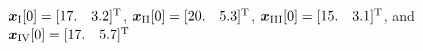 $\boldsymbol{x}_{\text{I}}[0]=[ \begin{matrix}
  17. & 3.2\\
\end{matrix} ]^{\mathrm{T}}$,
$\boldsymbol{x}_{\text{II}}[0]=[ \begin{matrix}
  20. & 5.3\\
\end{matrix} ]^{\mathrm{T}}$,
$\boldsymbol{x}_{\text{III}}[0]=[ \begin{matrix}
  15. & 3.1\\
\end{matrix} ]^{\mathrm{T}}$,
and
$\boldsymbol{x}_{\text{IV}}[0]=[ \begin{matrix}
  17. & 5.7\\
\end{matrix} ]^{\mathrm{T}}$